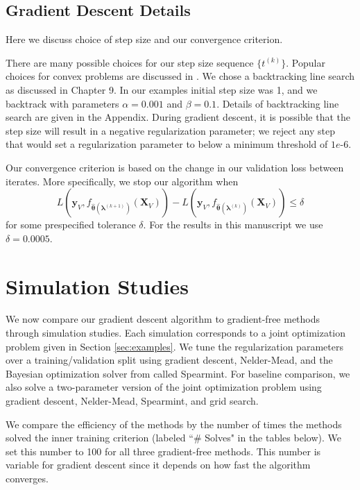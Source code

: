 \documentclass[12pt]{article}
\begin{document}
\subsection{Gradient Descent Details}\label{sec:alg_details}
Here we discuss choice of step size and our convergence criterion.

There are many possible choices for our step size sequence $\{t^{(k)}\}$. Popular choices for convex problems are discussed in \citet{boyd2004convex}. We chose a backtracking line search as discussed in Chapter 9. In our examples initial step size was 1, and we backtrack with parameters $\alpha = 0.001$ and $\beta = 0.1$. Details of backtracking line search are given in the Appendix. During gradient descent, it is possible that the step size will result in a negative regularization parameter; we reject any step that would set a regularization parameter to below a minimum threshold of $1e$-6.

Our convergence criterion is based on the change in our validation loss between iterates. More specifically, we stop our algorithm when
\[
L \left( \boldsymbol{y}_V, f_{\hat{\boldsymbol \theta}(\boldsymbol{\lambda}^{(k+1)})}(\boldsymbol{X}_V)\right) -
L \left( \boldsymbol{y}_V, f_{\hat{\boldsymbol \theta}(\boldsymbol{\lambda}^{(k)})}(\boldsymbol{X}_V)\right) \leq \delta
\]
for some prespecified tolerance $\delta$. For the results in this manuscript we use $\delta = 0.0005$.

\section{Simulation Studies}\label{sec:results}

We now compare our gradient descent algorithm to gradient-free methods through simulation studies. Each simulation corresponds to a joint optimization problem given in Section \ref{sec:examples}. We tune the regularization parameters over a training/validation split using gradient descent, Nelder-Mead, and the Bayesian optimization solver from \citet{snoek2012practical} called Spearmint. For baseline comparison, we also solve a two-parameter version of the joint optimization problem using gradient descent, Nelder-Mead, Spearmint, and grid search.

We compare the efficiency of the methods by the number of times the methods solved the inner training criterion (labeled ``\# Solves" in the tables below). We set this number to 100 for all three gradient-free methods. This number is variable for gradient descent since it depends on how fast the algorithm converges.
\end{document}
